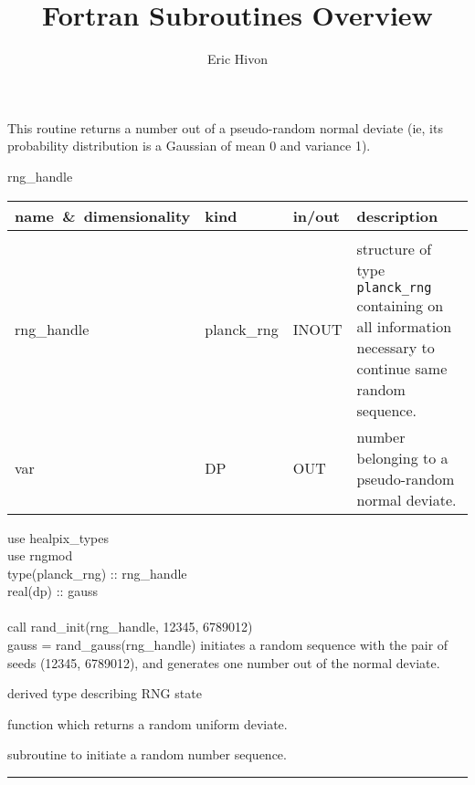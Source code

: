 
\sloppy


\title{\healpix Fortran Subroutines Overview}
 \section[rand\_gauss]{ }
\label{sub:rand_gauss}
\author{Eric Hivon}

\begin{facility}
{This routine returns a number out of a pseudo-random normal deviate (ie, its
  probability distribution is a Gaussian of mean 0 and variance 1).
}
{\modRngmod}
\end{facility}

\begin{f90function}
{rng\_handle}
\end{f90function}

\begin{arguments}
{
\begin{tabular}{p{0.3\hsize} p{0.15\hsize} p{0.1\hsize} p{0.35\hsize}} \hline  
\textbf{name~\&~dimensionality} & \textbf{kind} & \textbf{in/out} & \textbf{description} \\ \hline
                   &   &   &                           \\ %
rng\_handle & planck\_rng & INOUT & structure of type {\tt planck\_rng}
                   containing on all information necessary to continue same
                   random sequence. \\ 
var & DP & OUT & number belonging to a pseudo-random normal deviate.
\end{tabular}
}
\end{arguments}

\begin{example}
{
use healpix\_types \\
use rngmod \\
type(planck\_rng) :: rng\_handle \\
real(dp) :: gauss \\
\\
call rand\_init(rng\_handle, 12345, 6789012)  \\
gauss = rand\_gauss(rng\_handle)
}
{
initiates a random sequence with the pair of seeds (12345, 6789012), and
generates one number out of the normal deviate.
}
\end{example}

\begin{related}
  \begin{sulist}{} %
  \item[\htmlref{planck\_rng}{sub:planck_rng}] derived type describing RNG state
  \item[\htmlref{rand\_uni}{sub:rand_uni}] function which returns a random uniform deviate.
   \item[\htmlref{rand\_init}{sub:rand_init}] subroutine to initiate a random number sequence. 
  \end{sulist}
\end{related}

\rule{\hsize}{2mm}

\newpage
